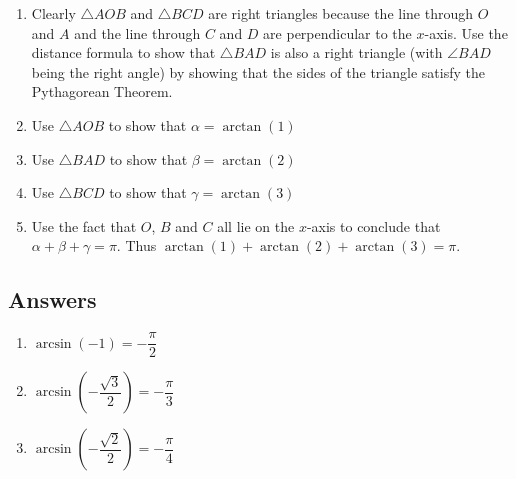 \begin{enumerate}
\begin{center}
\end{center}

\begin{enumerate}

\item Clearly $\triangle AOB$ and $\triangle BCD$ are right triangles because the line through $O$ and $A$ and the line through $C$ and $D$ are perpendicular to the $x$-axis.  Use the distance formula to show that $\triangle BAD$ is also a right triangle (with $\angle BAD$ being the right angle) by showing that the sides of the triangle satisfy the Pythagorean Theorem.

\item Use $\triangle AOB$ to show that $\alpha = \arctan(1)$
\item Use $\triangle BAD$ to show that $\beta = \arctan(2)$
\item Use $\triangle BCD$ to show that $\gamma = \arctan(3)$

\item Use the fact that $O$, $B$ and $C$ all lie on the $x$-axis to conclude that $\alpha + \beta + \gamma = \pi$.  Thus $\arctan(1) + \arctan(2) + \arctan(3) = \pi$.

\end{enumerate}

\end{enumerate}

\newpage

\subsection{Answers}

 \begin{multicols}{3} 

\begin{enumerate}

\item $\arcsin \left( -1 \right) = -\dfrac{\pi}{2}$ 
\item $\arcsin \left( -\dfrac{\sqrt{3}}{2} \right) = -\dfrac{\pi}{3}$
\item $\arcsin \left( -\dfrac{\sqrt{2}}{2} \right) = -\dfrac{\pi}{4}$

\setcounter{HW}{\value{enumi}}

\end{enumerate}

\end{multicols}

